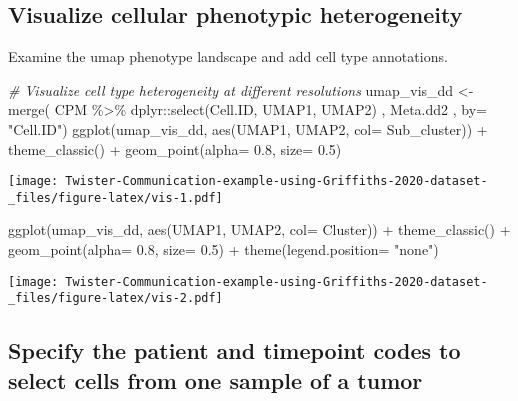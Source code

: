 \documentclass[
]{article}
\newenvironment{Shaded}{\begin{snugshade}}{\end{snugshade}}
\newcommand{\AttributeTok}[1]{\textcolor[rgb]{0.77,0.63,0.00}{#1}}
\newcommand{\CommentTok}[1]{\textcolor[rgb]{0.56,0.35,0.01}{\textit{#1}}}
\newcommand{\FloatTok}[1]{\textcolor[rgb]{0.00,0.00,0.81}{#1}}
\newcommand{\FunctionTok}[1]{\textcolor[rgb]{0.00,0.00,0.00}{#1}}
\newcommand{\NormalTok}[1]{#1}
\newcommand{\OtherTok}[1]{\textcolor[rgb]{0.56,0.35,0.01}{#1}}
\newcommand{\SpecialCharTok}[1]{\textcolor[rgb]{0.00,0.00,0.00}{#1}}
\newcommand{\StringTok}[1]{\textcolor[rgb]{0.31,0.60,0.02}{#1}}
\begin{document}
\hypertarget{visualize-cellular-phenotypic-heterogeneity}{%
\subsection{Visualize cellular phenotypic
heterogeneity}\label{visualize-cellular-phenotypic-heterogeneity}}

Examine the umap phenotype landscape and add cell type annotations.

\begin{Shaded}
\begin{Highlighting}[]
\CommentTok{\# Visualize cell type heterogeneity at different resolutions}
\NormalTok{umap\_vis\_dd }\OtherTok{\textless{}{-}} \FunctionTok{merge}\NormalTok{( CPM }\SpecialCharTok{\%\textgreater{}\%}\NormalTok{ dplyr}\SpecialCharTok{::}\FunctionTok{select}\NormalTok{(Cell.ID, UMAP1, UMAP2) , Meta.dd2 , }\AttributeTok{by=} \StringTok{"Cell.ID"}\NormalTok{)}
\FunctionTok{ggplot}\NormalTok{(umap\_vis\_dd, }\FunctionTok{aes}\NormalTok{(UMAP1, UMAP2, }\AttributeTok{col=}\NormalTok{ Sub\_cluster)) }\SpecialCharTok{+} \FunctionTok{theme\_classic}\NormalTok{() }\SpecialCharTok{+} \FunctionTok{geom\_point}\NormalTok{(}\AttributeTok{alpha=} \FloatTok{0.8}\NormalTok{, }\AttributeTok{size=} \FloatTok{0.5}\NormalTok{)}
\end{Highlighting}
\end{Shaded}

\texttt{[image: Twister-Communication-example-using-Griffiths-2020-dataset-\_files/figure-latex/vis-1.pdf]}

\begin{Shaded}
\begin{Highlighting}[]
\FunctionTok{ggplot}\NormalTok{(umap\_vis\_dd, }\FunctionTok{aes}\NormalTok{(UMAP1, UMAP2, }\AttributeTok{col=}\NormalTok{ Cluster)) }\SpecialCharTok{+} \FunctionTok{theme\_classic}\NormalTok{() }\SpecialCharTok{+} \FunctionTok{geom\_point}\NormalTok{(}\AttributeTok{alpha=} \FloatTok{0.8}\NormalTok{, }\AttributeTok{size=} \FloatTok{0.5}\NormalTok{) }\SpecialCharTok{+} \FunctionTok{theme}\NormalTok{(}\AttributeTok{legend.position=} \StringTok{"none"}\NormalTok{)}
\end{Highlighting}
\end{Shaded}

\texttt{[image: Twister-Communication-example-using-Griffiths-2020-dataset-\_files/figure-latex/vis-2.pdf]}

\hypertarget{specify-the-patient-and-timepoint-codes-to-select-cells-from-one-sample-of-a-tumor}{%
\subsection{Specify the patient and timepoint codes to select cells from
one sample of a
tumor}\label{specify-the-patient-and-timepoint-codes-to-select-cells-from-one-sample-of-a-tumor}}
\end{document}
